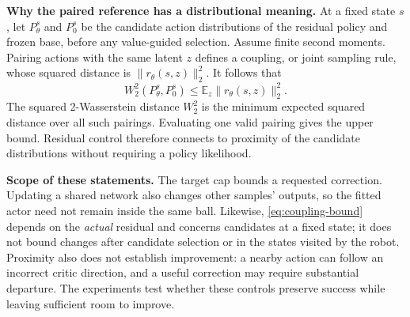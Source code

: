 \textbf{Why the paired reference has a distributional meaning.}
At a fixed state $s$, let $P_\theta^s$ and $P_0^s$ be the candidate action
distributions of the residual policy and frozen base, before any
value-guided selection. Assume finite second moments. Pairing actions
with the same latent $z$ defines a coupling, or joint sampling rule, whose
squared distance is $\|r_\theta(s,z)\|_2^2$. It follows that
\begin{equation}
 W_2^2(P_\theta^s,P_0^s)
 \leq \mathbb E_z\|r_\theta(s,z)\|_2^2.
 \label{eq:coupling-bound}
\end{equation}
The squared 2-Wasserstein distance $W_2^2$ is the minimum expected squared
distance over all such pairings. Evaluating one valid pairing gives the
upper bound. Residual control therefore connects to proximity of the
candidate distributions without requiring a policy likelihood.

\textbf{Scope of these statements.}
The target cap bounds a requested correction. Updating a shared network
also changes other samples' outputs, so the fitted actor need not remain
inside the same ball. Likewise, \eqref{eq:coupling-bound} depends on the
\emph{actual} residual and concerns candidates at a fixed state; it does
not bound changes after candidate selection or in the states visited by
the robot. Proximity also does not establish improvement: a nearby action
can follow an incorrect critic direction, and a useful correction may
require substantial departure. The experiments test whether these controls
preserve success while leaving sufficient room to improve.

